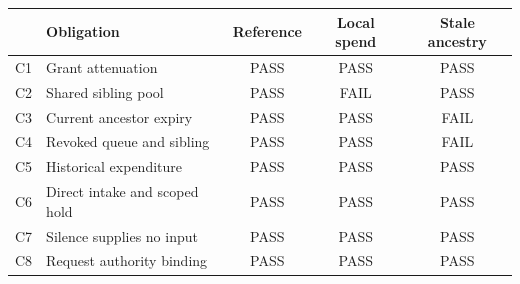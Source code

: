 \begin{tabularx}{\linewidth}{@{}lXccc@{}}\toprule
 & Obligation & Reference & Local spend & Stale ancestry\\\midrule
C1 & Grant attenuation & PASS & PASS & PASS\\
C2 & Shared sibling pool & PASS & FAIL & PASS\\
C3 & Current ancestor expiry & PASS & PASS & FAIL\\
C4 & Revoked queue and sibling & PASS & PASS & FAIL\\
C5 & Historical expenditure & PASS & PASS & PASS\\
C6 & Direct intake and scoped hold & PASS & PASS & PASS\\
C7 & Silence supplies no input & PASS & PASS & PASS\\
C8 & Request authority binding & PASS & PASS & PASS\\
\bottomrule\end{tabularx}
